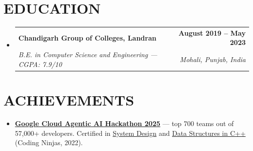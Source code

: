 \documentclass[letterpaper,10pt]{article}
\makeatletter
\newcommand{\resumeItem}[1]{\item\small{{#1 \vspace{-3pt}}}}
\newcommand{\resumeSubheading}[4]{
  \vspace{-2pt}\item
    \begin{tabular*}{1.0\textwidth}[t]{l@{\extracolsep{\fill}}r}
      \textbf{\large#1} & \textbf{\small #2} \\
      \textit{\small#3} & \textit{\small #4} \\
    \end{tabular*}\vspace{-7pt}
}
\newcommand{\resumeSubHeadingListStart}{\begin{itemize}[leftmargin=0.0in, label={}]}
\newcommand{\resumeSubHeadingListEnd}{\end{itemize}}
\newcommand{\resumeItemListStart}{\begin{itemize}}
\newcommand{\resumeItemListEnd}{\end{itemize}\vspace{-6pt}}
\makeatother
\begin{document}
\vspace{-11pt}

\section{EDUCATION}
  \resumeSubHeadingListStart
    \resumeSubheading
      {Chandigarh Group of Colleges, Landran}{August 2019 -- May 2023}
      {B.E. in Computer Science and Engineering — CGPA: 7.9/10}{Mohali, Punjab, India}
  \resumeSubHeadingListEnd

\vspace{-7pt}

\section{ACHIEVEMENTS}
    \vspace{2pt}
    \resumeItemListStart
        \resumeItem{\textbf{\href{https://github.com/abhikumar002/Agentic-Gig-Project}{Google Cloud Agentic AI Hackathon 2025}} — top 700 teams out of 57,000+ developers. Certified in \href{http://ninjasfiles.s3.amazonaws.com/certificate18894980e4209379ac28665887f78da42bac5c2.pdf}{System Design} and \href{https://ninjasfiles.s3.amazonaws.com/certificate19853580c201378561a01f48ae87f59e9220db2.pdf}{Data Structures in C++} (Coding Ninjas, 2022).}
    \resumeItemListEnd
\end{document}
